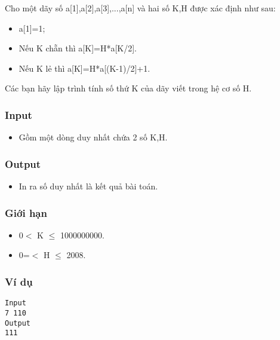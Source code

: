 



   Cho một dãy số a[1],a[2],a[3],...,a[n] và hai số K,H được xác định như sau:  
\begin{itemize}
	\item     a[1]=1;   
	\item     Nếu K chẵn thì a[K]=H*a[K/2].   
	\item     Nếu K lẻ thì a[K]=H*a[(K-1)/2]+1.   
\end{itemize}

   Các bạn hãy lập trình tính số thứ K của dãy viết trong hệ cơ số H.  

\subsubsection{   Input  }
\begin{itemize}
	\item     Gồm một dòng duy nhất chứa 2 số K,H.   
\end{itemize}

\subsubsection{   Output  }
\begin{itemize}
	\item     In ra số duy nhất là kết quả bài toán.   
\end{itemize}

\subsubsection{   Giới hạn  }
\begin{itemize}
	\item     0$<$ K  $\le$ 1000000000.   
	\item     0=$<$ H  $\le$ 2008.   
\end{itemize}

\subsubsection{   Ví dụ  }
\begin{verbatim}
Input
7 110
Output
111
\end{verbatim}
